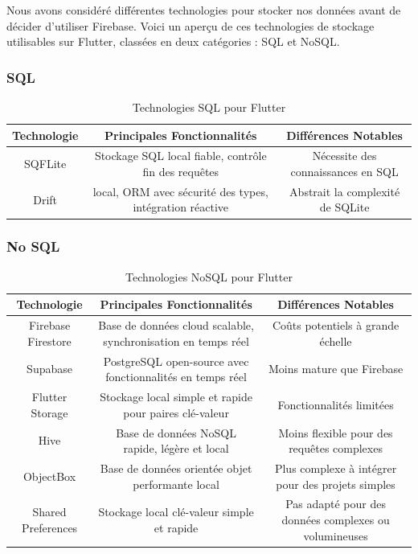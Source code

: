 Nous avons considéré différentes technologies pour stocker nos données avant de décider d'utiliser Firebase. Voici un aperçu de ces technologies de stockage utilisables sur Flutter, classées en deux catégories : SQL et NoSQL.

\subsubsection{SQL}

\begin{table}[h!]
    \centering
    \begin{tabular}{|c|c|c|}
    \hline
    \textbf{Technologie} & \textbf{Principales Fonctionnalités} & \textbf{Différences Notables} \\
    \hline
    SQFLite & Stockage SQL local fiable, contrôle fin des requêtes & Nécessite des connaissances en SQL \\
    \hline
    Drift & local, ORM avec sécurité des types, intégration réactive & Abstrait la complexité de SQLite \\
    \hline
    \end{tabular}
    \caption{Technologies SQL pour Flutter}
\end{table}

\subsubsection{No SQL}

\begin{table}[h!]
    \centering
    \begin{tabular}{|c|c|c|}
    \hline
    \textbf{Technologie} & \textbf{Principales Fonctionnalités} & \textbf{Différences Notables} \\
    \hline
    Firebase Firestore & Base de données cloud scalable, synchronisation en temps réel & Coûts potentiels à grande échelle \\
    \hline
    Supabase & PostgreSQL open-source avec fonctionnalités en temps réel & Moins mature que Firebase \\
    \hline
    Flutter Storage & Stockage local simple et rapide pour paires clé-valeur & Fonctionnalités limitées \\
    \hline
    Hive & Base de données NoSQL rapide, légère et local & Moins flexible pour des requêtes complexes \\
    \hline
    ObjectBox & Base de données orientée objet performante local& Plus complexe à intégrer pour des projets simples \\
    \hline
    Shared Preferences & Stockage local clé-valeur simple et rapide & Pas adapté pour des données complexes ou volumineuses \\
    \hline
    \end{tabular}
    \caption{Technologies NoSQL pour Flutter}
\end{table}

